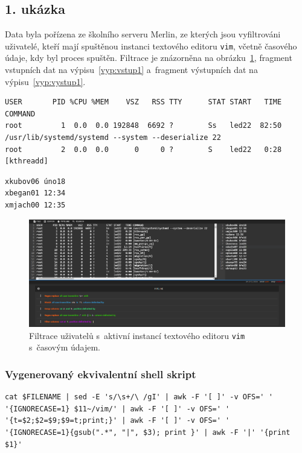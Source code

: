 \subsection*{1. ukázka}
Data byla pořízena ze školního serveru Merlin, ze kterých jsou vyfiltrováni uživatelé, kteří mají spuštěnou instanci textového editoru \texttt{vim}, včetně časového údaje, kdy byl proces spuštěn. Filtrace je znázorněna na obrázku~\ref{obr:Filtrace1}, fragment vstupních dat na výpisu~\ref{vyp:vstup1} a~fragment výstupních dat na výpisu~\ref{vyp:vystup1}.

\clearpage
\begin{lstlisting}[caption={Fragment vstupních dat.}, label={vyp:vstup1}]
USER       PID %CPU %MEM    VSZ   RSS TTY      STAT START   TIME COMMAND
root         1  0.0  0.0 192848  6692 ?        Ss   led22  82:50 /usr/lib/systemd/systemd --system --deserialize 22
root         2  0.0  0.0      0     0 ?        S    led22   0:28 [kthreadd]
\end{lstlisting}

\begin{lstlisting}[language=TeX, caption={Fragment výstupních dat.}, label={vyp:vystup1}]
xkubov06 úno18 
xbegan01 12:34 
xmjach00 12:35 
\end{lstlisting}

\begin{figure}[hbt]
	\centering
	\setlength{\fboxsep}{0pt}
	\includegraphics[width=1\textwidth]{obrazky-figures/Filtrace1.PNG}
	\caption{Filtrace uživatelů s~aktivní instancí textového editoru \texttt{vim} s~časovým údajem.}
	\label{obr:Filtrace1}
\end{figure}

\subsubsection*{Vygenerovaný ekvivalentní shell skript}
\begin{verbatim}
cat $FILENAME | sed -E 's/\s+/\ /gI' | awk -F '[ ]' -v OFS=' ' 
'{IGNORECASE=1} $11~/vim/' | awk -F '[ ]' -v OFS=' ' 
'{t=$2;$2=$9;$9=t;print;}' | awk -F '[ ]' -v OFS=' ' 
'{IGNORECASE=1}{gsub(".*", "|", $3); print }' | awk -F '|' '{print $1}'
\end{verbatim}

